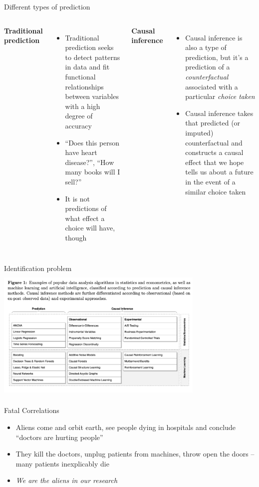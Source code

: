\documentclass{beamer}
\begin{document}
\begin{frame}{Different types of prediction}

  \begin{columns}
    \centering
    \textbf{Traditional prediction}
    \begin{itemize}
      \item Traditional prediction seeks to detect patterns in data and fit functional relationships between variables with a high degree of accuracy
      \item ``Does this person have heart disease?'', ``How many books will I sell?''
      \item It is not predictions of what effect a choice will have, though
    \end{itemize}
    \centering
    \textbf{Causal inference}
    \begin{itemize}
      \item Causal inference is also a type of prediction, but it's a prediction of a \emph{counterfactual} associated with a particular \emph{choice taken}
      \item Causal inference takes that predicted (or imputed) counterfactual and constructs a causal effect that we hope tells us about a future in the event of a similar choice taken
    \end{itemize}
  \end{columns}
\end{frame}


\begin{frame}{Identification problem}
  \centering
  \includegraphics[scale=0.5,height=6.5cm, width=10cm]{./lecture_includes/prediction_causality.png}
\end{frame}




\begin{frame}{Fatal Correlations}

  \begin{itemize}
    \item Aliens come and orbit earth, see people dying in hospitals and conclude ``doctors are hurting people''
    \item They kill the doctors, unplug patients from machines, throw open the doors -- many patients inexplicably die
    \item \emph{We are the aliens in our research}
  \end{itemize}

\end{frame}
\end{document}
